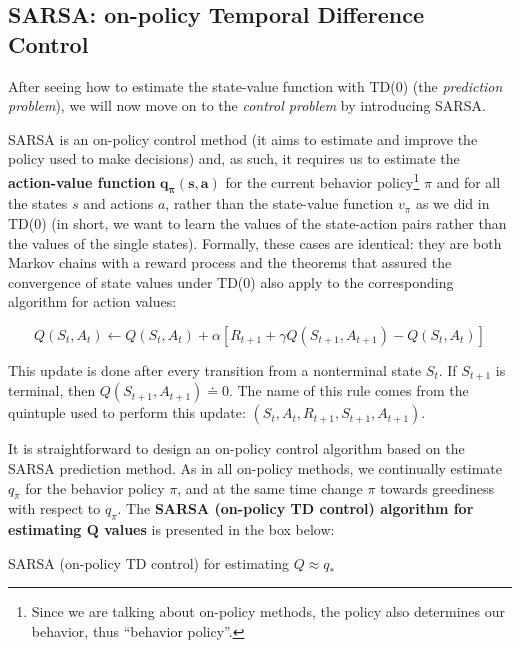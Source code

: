 \subsection{SARSA: on-policy Temporal Difference Control}
After seeing how to estimate the state-value function with TD(0) (the \textit{prediction problem}), we will now move on to the \textit{control problem} by introducing SARSA.

SARSA is an on-policy control method (it aims to estimate and improve the policy used to make decisions) and, as such, it requires us to estimate the \textbf{action-value function} $\boldsymbol{q_\pi (s,a)}$ for the current behavior policy\footnote{Since we are talking about on-policy methods, the policy also determines our behavior, thus ``behavior policy''.}  $\pi$ and for all the states $s$ and actions $a$, rather than the state-value function $v_\pi$ as we did in TD(0) (in short, we want to learn the values of the state-action pairs rather than the values of the single states). Formally, these cases are identical: they are both Markov chains with a reward process and the theorems that assured the convergence of state values under TD(0) also apply to the corresponding algorithm for action values:

\begin{equation}
    Q(S_t,A_t) \leftarrow Q(S_t,A_t) + \alpha \left[ R_{t+1} + \gamma Q(S_{t+1},A_{t+1}) - Q(S_t,A_t) \right]
    \label{eq:ch5-sarsaupdaterule}
\end{equation}

This update is done after every transition from a nonterminal state $S_t$. If $S_{t+1}$ is terminal, then $Q(S_{t+1},A_{t+1}) \doteq 0$. The name of this rule comes from the quintuple used to perform this update: $\left(S_t,A_t,R_{t+1},S_{t+1},A_{t+1}\right)$.

It is straightforward to design an on-policy control algorithm based on the SARSA prediction method. As in all on-policy methods, we continually estimate $q_\pi$ for the behavior policy $\pi$, and at the same time change $\pi$ towards greediness with respect to $q_\pi$. The \textbf{SARSA (on-policy TD control) algorithm for estimating $\boldsymbol{Q}$ values} is presented in the box below:

\begin{algorithm}[H]
\SetAlgoLined
\Parameters{step size $\alpha \in \left] 0,1 \right]$, small $\epsilon > 0$}

\caption{SARSA (on-policy TD control) for estimating $Q \approx q_*$}
\end{algorithm}

